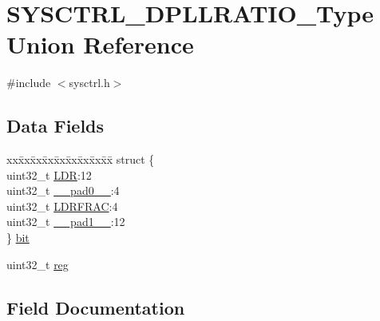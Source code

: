 \hypertarget{union_s_y_s_c_t_r_l___d_p_l_l_r_a_t_i_o___type}{}\section{S\+Y\+S\+C\+T\+R\+L\+\_\+\+D\+P\+L\+L\+R\+A\+T\+I\+O\+\_\+\+Type Union Reference}
\label{union_s_y_s_c_t_r_l___d_p_l_l_r_a_t_i_o___type}


{\ttfamily \#include $<$sysctrl.\+h$>$}

\subsection*{Data Fields}
\begin{DoxyCompactItemize}
\item 
\begin{tabbing}
xx\=xx\=xx\=xx\=xx\=xx\=xx\=xx\=xx\=\kill
struct \{\\
\>uint32\_t \mbox{\hyperlink{union_s_y_s_c_t_r_l___d_p_l_l_r_a_t_i_o___type_a0485a0720537972fddcfeb5a81742d07}{LDR}}:12\\
\>uint32\_t \mbox{\hyperlink{union_s_y_s_c_t_r_l___d_p_l_l_r_a_t_i_o___type_a3e57c2ef1c3ffb36722f000cc1156824}{\_\_pad0\_\_}}:4\\
\>uint32\_t \mbox{\hyperlink{union_s_y_s_c_t_r_l___d_p_l_l_r_a_t_i_o___type_af5b648b3b3bc51999fa2282b8126ba74}{LDRFRAC}}:4\\
\>uint32\_t \mbox{\hyperlink{union_s_y_s_c_t_r_l___d_p_l_l_r_a_t_i_o___type_a6712ba6dd1d5b43d2d56ff8ac4e275a7}{\_\_pad1\_\_}}:12\\
\} \mbox{\hyperlink{union_s_y_s_c_t_r_l___d_p_l_l_r_a_t_i_o___type_a5fbf3cd05b66b9b17510e2b22e78cc9b}{bit}}\\

\end{tabbing}\item 
uint32\+\_\+t \mbox{\hyperlink{union_s_y_s_c_t_r_l___d_p_l_l_r_a_t_i_o___type_a6b91636401516a477989a336376d7b40}{reg}}
\end{DoxyCompactItemize}


\subsection{Field Documentation}
\mbox{\label{union_s_y_s_c_t_r_l___d_p_l_l_r_a_t_i_o___type_a3e57c2ef1c3ffb36722f000cc1156824}} 

